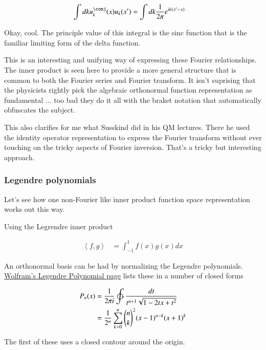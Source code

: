 \documentclass{article}
\newcommand{\Innerprod}[2]{\left\langle{#1}, {#2}\right\rangle}
\begin{document}
\begin{align*}
\int dk u_k^\conj(x) u_k(x')
&=
\int dk \inv{2\pi} e^{ i k (x' - x)}
\end{align*}

Okay, cool.  The principle value of this integral is the sinc function
that is the familiar limiting form of the delta function.

This is an interesting and unifying way of expressing these Fourier 
relationships.  The inner product is seen here to provide a more general
structure that is common to both the Fourier series and Fourier transform.
It isn't suprising that the physicists rightly pick the algebraic
orthonormal function representation as fundamental ... too bad they do it
all with the braket notation that automatically obfuscates the subject.

This also clarifies for me what Susskind did in his QM lectures.  There
he used the identity operator representation to express the Fourier transform
without ever touching on the tricky aspects of Fourier inversion.  That's a
tricky but interesting approach.

\subsubsection{ Legendre polynomials }

Let's see how one non-Fourier like inner product function space 
representation works out this way.

Using the Legrendre inner product

\begin{align*}
\Innerprod{f}{g} &= \int_{-1}^1 f(x) g(x) dx
\end{align*}

An orthonormal basis can be had by normalizing the 
Legendre polynomials.  
\href{ http://mathworld.wolfram.com/LegendrePolynomial.html }{Wolfram's Legendre Polynomial page} lists these in a number of closed forms

\begin{align*}
P_n(x) 
&= \inv{2 \pi i} \ointctrclockwise \frac{dt}{t^{n+1}\sqrt{1 - 2t x +t^2}} \\
&= \inv{2^n}\sum_{k=0}^n {\binom{n}{k}}^2 (x-1)^{n-k}(x+1)^k
\end{align*}

The first of these uses a closed contour around the origin.
\end{document}
